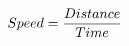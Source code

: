 \documentclass[preview]{standalone}
\begin{document}
\begin{align*}
\special{dvisvgm:raw <g id='unique000'>}Speed = \frac{Distance}{Time}\special{dvisvgm:raw </g>}
\end{align*}
\end{document}
